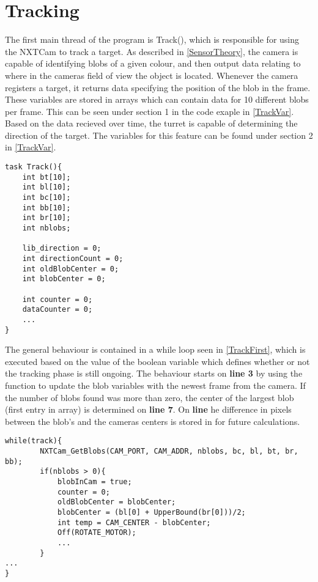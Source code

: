 \section{Tracking}
The first main thread of the program is Track(), which is responsible for using
the NXTCam to track a target. As described in \autoref{SensorTheory}, the camera
is capable of identifying blobs of a given colour, and then output data relating to where
in the cameras field of view the object is located. Whenever the camera
registers a target, it returns data specifying the position of the blob in the
frame. These variables are stored in arrays which can contain data for 10
different blobs per frame. This can be seen under section 1 in the code exaple
in \autoref{TrackVar}. Based on the data recieved over time, the turret is
capable of determining the direction of the target. The variables
for this feature can be found under section 2 in \autoref{TrackVar}.\nl
 
\begin{minipage}[H]{\linewidth}
\begin{lstlisting}[caption = Variables used on the Track() thread., label = TrackVar, style = nc] 
task Track(){
    int bt[10];
    int bl[10];
    int bc[10];
    int bb[10];
    int br[10];
    int nblobs;

    lib_direction = 0;
    int directionCount = 0;
    int oldBlobCenter = 0;
    int blobCenter = 0;

    int counter = 0;
    dataCounter = 0;
    ...
}
\end{lstlisting}
\end{minipage}

The general behaviour is contained in a while loop seen in \autoref{TrackFirst},
which is executed based on the value of the boolean variable
 which defines whether or not the tracking phase is still
ongoing. The behaviour starts on \textbf{line 3} by using the
 function to update the blob variables with
the newest frame from the camera. If the number of blobs found was more than
zero, the center of the largest blob (first entry in array) is determined on
\textbf{line 7}. On \textbf{line } he difference in pixels between the blob's
and the cameras centers is stored in  for future
calculations.\nl
  
\begin{minipage}[H]{\linewidth}
\begin{lstlisting}[caption = First part of the general tracking behaviour., label = TrackFirst] while(track){
        NXTCam_GetBlobs(CAM_PORT, CAM_ADDR, nblobs, bc, bl, bt, br, bb);
        if(nblobs > 0){
            blobInCam = true;
            counter = 0;
            oldBlobCenter = blobCenter;
            blobCenter = (bl[0] + UpperBound(br[0]))/2;
            int temp = CAM_CENTER - blobCenter;
            Off(ROTATE_MOTOR);
            ...
        }
...
}        
            
\end{lstlisting}
\end{minipage}

